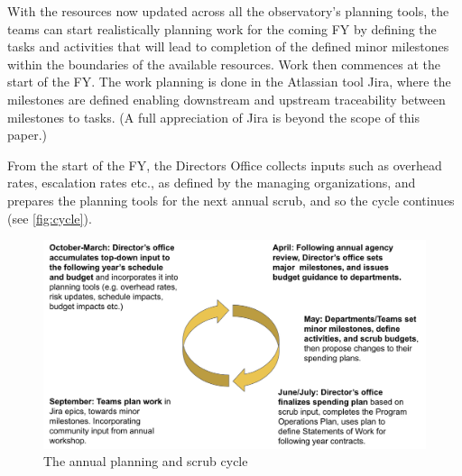 With the resources now updated across all the observatory's planning tools, the teams can start realistically planning work for the coming FY by defining the tasks and activities that will lead to completion of the defined minor milestones within the boundaries of the available resources. 
Work then commences at the start of the FY. 
The work planning is done in the Atlassian tool Jira, where the milestones are defined enabling downstream and upstream traceability between milestones to tasks. 
(A full appreciation of Jira is beyond the scope of this paper.)

From the start of the FY, the Directors Office collects inputs such as overhead rates, escalation rates etc., as defined by the managing organizations, and prepares the planning tools for the next annual scrub, and so the cycle continues (see \autoref{fig:cycle}).

\begin{figure}[h!]
\begin{centering}
\includegraphics[width=1.0\textwidth]{Figure2AnnualPlanningScrubCycle}
	\caption{The annual planning and scrub cycle
\label{fig:cycle}}
\end{centering}
\end{figure}
